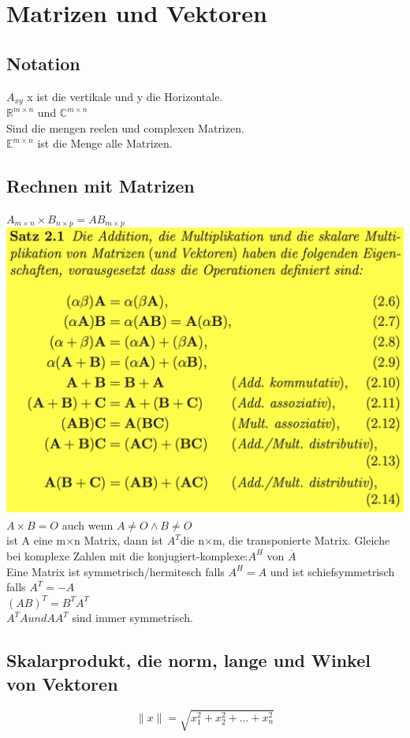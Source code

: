 \documentclass[11pt]{article}
\newcommand\back[1][-3cm]{\hspace*{#1}}
\begin{document}
\section{Matrizen und Vektoren}
\subsection{Notation}
$A_{xy}$ x ist die vertikale und y die Horizontale.\\
$\mathbb{R}^{m\times n}$ und $\mathbb{C}^{m\times n}$\\Sind die mengen reelen und complexen Matrizen.\\$\mathbb{E}^{m\times n}$ ist die Menge alle Matrizen.\\
\subsection{Rechnen mit Matrizen}
$A_{m\times n}\times B_{n\times p} = AB_{m\times p}$\\
\back\includegraphics{images/matrizen}\\
$A\times B = O$ auch wenn $A\neq O \wedge B\neq O$\\
ist A eine m$\times$n Matrix, dann ist $A^T$die n$\times$m, die transponierte Matrix. Gleiche bei komplexe Zahlen mit die konjugiert-komplexe:$A^H$ von $\overline{A}$\\
Eine Matrix ist symmetrisch/hermitesch falls $A^H = A$ und ist schiefsymmetrisch falls $A^T = -A$\\$(AB)^T = B^TA^T$\\$A^TA und AA^T$ sind immer symmetrisch.
\subsection{Skalarprodukt, die norm, lange und Winkel von Vektoren}
\begin{equation}
	\parallel x\parallel = \sqrt{x_1^2+x_2^2+...+x_n^2}
\end{equation}
\end{document}
